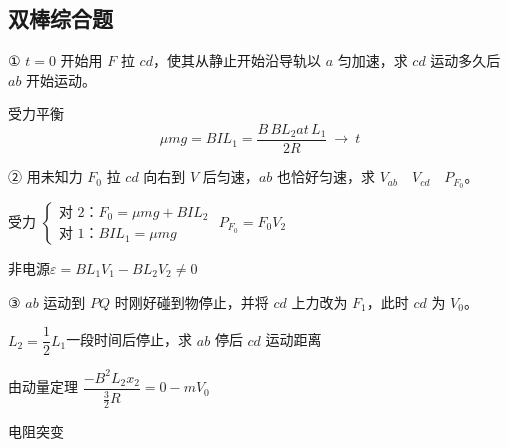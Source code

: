 \subsection{双棒综合题}
\begin{problem}
① $t=0$ 开始用 $F$ 拉 $cd$，使其从静止开始沿导轨以 $a$ 匀加速，求 $cd$ 运动多久后 $ab$ 开始运动。
\begin{solution}
受力平衡 %
\[ \mu mg=BIL_1=\frac{B\,BL_2at\,L_1}{2R}\ \to\ t \]
\end{solution}
② 用未知力 $F_0$ 拉 $cd$ 向右到 $V$ 后匀速，$ab$ 也恰好匀速，求 $V_{ab}$　$V_{cd}$　$P_{F_0}$。
\begin{solution}
受力 $\left\{\begin{array}{l}\text{对 2：}F_0=\mu mg+BIL_2\\ \text{对 1：}BIL_1=\mu mg\end{array}\right.$ \qquad $P_{F_0}=F_0V_2$

非电源\quad $\varepsilon=BL_1V_1-BL_2V_2\neq 0$ %
\end{solution}
③ $ab$ 运动到 $PQ$ 时刚好碰到物停止，并将 $cd$ 上力改为 $F_1$，此时 $cd$ 为 $V_0$。

$L_2=\dfrac{1}{2}L_1$\qquad 一段时间后停止，求 $ab$ 停后 $cd$ 运动距离
\begin{solution}
由动量定理 \quad $\dfrac{-B^2L_2x_2}{\frac{3}{2}R}=0-mV_0$

电阻突变
\end{solution}
\end{problem}

